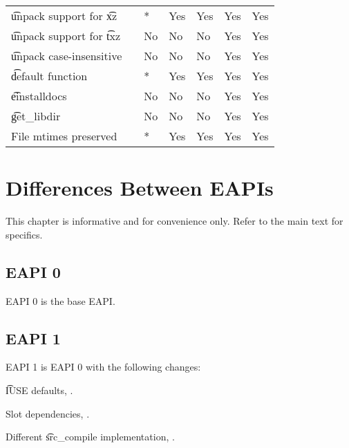 \begin{landscape}
\begin{longtable}{llP{7.5em}P{7.5em}P{7.5em}P{7.5em}P{7.5em}}
\t{unpack} support for \t{xz} &  &
    * & Yes & Yes & Yes & Yes \\

\t{unpack} support for \t{txz} &  &
    No & No & No & Yes & Yes \\

\t{unpack} case-insensitive &  &
    No & No & No & Yes & Yes \\

\t{default} function &  &
    * & Yes & Yes & Yes & Yes \\

\t{einstalldocs} &  &
    No & No & No & Yes & Yes \\

\t{get_libdir} &  &
    No & No & No & Yes & Yes \\

File mtimes preserved &  &
    * & Yes & Yes & Yes & Yes \\

\end{longtable}
\end{landscape}

\chapter{Differences Between EAPIs}

\note This chapter is informative and for convenience only. Refer to the main text for specifics.

\section{EAPI 0}

EAPI 0 is the base EAPI.

\section{EAPI 1}

EAPI 1 is EAPI 0 with the following changes:

\begin{compactitem}
\item \t{IUSE} defaults, .
\item Slot dependencies, .
\item Different \t{src_compile} implementation, .
\end{compactitem}


